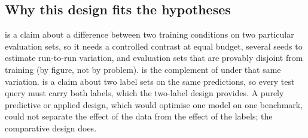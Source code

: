 \subsection{Why this design fits the hypotheses}

\Hone{} is a claim about a difference between two training conditions on two particular evaluation sets, so it needs a controlled contrast at equal budget, several seeds to estimate run-to-run variation, and evaluation sets that are provably disjoint from training (by figure, not by problem). \Hzero{} is the complement of \Hone{} under that same variation. \Htwo{} is a claim about two label sets on the same predictions, so every test query must carry both labels, which the two-label design provides. A purely predictive or applied design, which would optimise one model on one benchmark, could not separate the effect of the data from the effect of the labels; the comparative design does.
